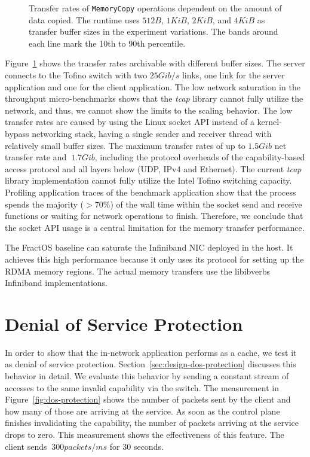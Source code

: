 \begin{figure}[H]
  \centering
  \resizebox{\textwidth}{!}{
    
  }
  \caption{\label{fig:eval-throughput-buf-size} Transfer rates of \texttt{MemoryCopy} operations dependent on the amount of data copied. The runtime uses $512B$, $1KiB$, $2KiB$, and $4KiB$ as transfer buffer sizes in the experiment variations. The bands around each line mark the 10th to 90th percentile.}
\end{figure}

Figure~\ref{fig:eval-throughput-buf-size} shows the transfer rates archivable with different buffer sizes. The server connects to the Tofino switch with two $25 Gib/s$ links, one link for the server application and one for the client application.
The low network saturation in the throughput micro-benchmarks shows that the \emph{tcap} library cannot fully utilize the network, and thus, we cannot show the limits to the scaling behavior.
The low transfer rates are caused by using the Linux socket \ac{API} instead of a kernel-bypass networking stack, having a single sender and receiver thread with relatively small buffer sizes. The maximum transfer rates of up to $1.5 Gib$ net transfer rate and $~1.7 Gib$, including the protocol overheads of the capability-based access protocol and all layers below (\ac{UDP}, \ac{IPv4} and Ethernet). The current \emph{tcap} library implementation cannot fully utilize the Intel Tofino switching capacity. Profiling application traces of the benchmark application show that the process spends the majority ($>70\%$) of the wall time within the socket send and receive functions or waiting for network operations to finish. Therefore, we conclude that the socket \ac{API} usage is a central limitation for the memory transfer performance.

The FractOS baseline can saturate the Infiniband \ac{NIC} deployed in the host. It achieves this high performance because it only uses its protocol for setting up the \ac{RDMA} memory regions. The actual memory transfers use the libibverbs Infiniband implementations.

\section{Denial of Service Protection}
In order to show that the in-network application performs as a cache, we test it as denial of service protection. Section~\ref{sec:design-dos-protection} discusses this behavior in detail. We evaluate this behavior by sending a constant stream of accesses to the same invalid capability via the switch. The measurement in Figure~\ref{fig:dos-protection} shows the number of packets sent by the client and how many of those are arriving at the service. As soon as the control plane finishes invalidating the capability, the number of packets arriving at the service drops to zero. This measurement shows the effectiveness of this feature. The client sends $~300 packets/ms$ for 30 seconds.

